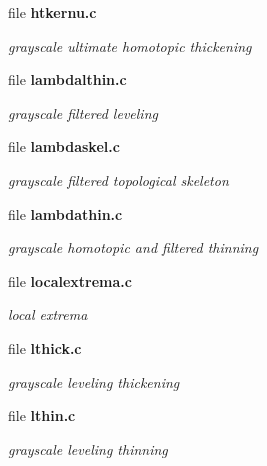 \begin{DoxyCompactItemize}
\item 
file {\bf htkernu.c}


\begin{DoxyCompactList}\small\item\em grayscale ultimate homotopic thickening \item\end{DoxyCompactList}

\item 
file {\bf lambdalthin.c}


\begin{DoxyCompactList}\small\item\em grayscale filtered leveling \item\end{DoxyCompactList}

\item 
file {\bf lambdaskel.c}


\begin{DoxyCompactList}\small\item\em grayscale filtered topological skeleton \item\end{DoxyCompactList}

\item 
file {\bf lambdathin.c}


\begin{DoxyCompactList}\small\item\em grayscale homotopic and filtered thinning \item\end{DoxyCompactList}

\item 
file {\bf localextrema.c}


\begin{DoxyCompactList}\small\item\em local extrema \item\end{DoxyCompactList}

\item 
file {\bf lthick.c}


\begin{DoxyCompactList}\small\item\em grayscale leveling thickening \item\end{DoxyCompactList}

\item 
file {\bf lthin.c}


\begin{DoxyCompactList}\small\item\em grayscale leveling thinning \item\end{DoxyCompactList}


\end{DoxyCompactItemize}
